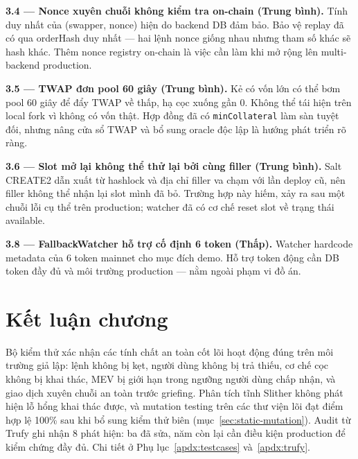 \documentclass[../DoAn.tex]{subfiles}
\begin{document}
\textbf{3.4 --- Nonce xuyên chuỗi không kiểm tra on-chain (Trung bình).} Tính duy nhất của (swapper, nonce) hiện do backend DB đảm bảo. Bảo vệ replay đã có qua orderHash duy nhất --- hai lệnh nonce giống nhau nhưng tham số khác sẽ hash khác. Thêm nonce registry on-chain là việc cần làm khi mở rộng lên multi-backend production.

\textbf{3.5 --- TWAP đơn pool 60 giây (Trung bình).} Kẻ có vốn lớn có thể bơm pool 60 giây để đẩy TWAP về thấp, hạ cọc xuống gần 0. Không thể tái hiện trên local fork vì không có vốn thật. Hợp đồng đã có \texttt{minCollateral} làm sàn tuyệt đối, nhưng nâng cửa sổ TWAP và bổ sung oracle độc lập là hướng phát triển rõ ràng.

\textbf{3.6 --- Slot mở lại không thể thử lại bởi cùng filler (Trung bình).} Salt CREATE2 dẫn xuất từ hashlock và địa chỉ filler va chạm với lần deploy cũ, nên filler không thể nhận lại slot mình đã bỏ. Trường hợp này hiếm, xảy ra sau một chuỗi lỗi cụ thể trên production; watcher đã có cơ chế reset slot về trạng thái available.

\textbf{3.8 --- FallbackWatcher hỗ trợ cố định 6 token (Thấp).} Watcher hardcode metadata của 6 token mainnet cho mục đích demo. Hỗ trợ token động cần DB token đầy đủ và môi trường production --- nằm ngoài phạm vi đồ án.

\section{Kết luận chương}
\label{sec:test-concl}

Bộ kiểm thử xác nhận các tính chất an toàn cốt lõi hoạt động đúng trên môi trường giả lập: lệnh không bị kẹt, người dùng không bị trả thiếu, cơ chế cọc không bị khai thác, MEV bị giới hạn trong ngưỡng người dùng chấp nhận, và giao dịch xuyên chuỗi an toàn trước griefing. Phân tích tĩnh Slither không phát hiện lỗ hổng khai thác được, và mutation testing trên các thư viện lõi đạt điểm hợp lệ 100\% sau khi bổ sung kiểm thử biên (mục~\ref{sec:static-mutation}). Audit từ Trufy ghi nhận 8 phát hiện: ba đã sửa, năm còn lại cần điều kiện production để kiểm chứng đầy đủ. Chi tiết ở Phụ lục~\ref{apdx:testcases} và~\ref{apdx:trufy}.
\end{document}
